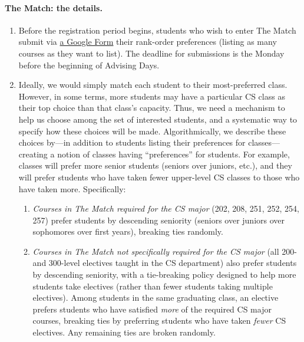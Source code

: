 \documentclass{article}
\begin{document}
\paragraph{The Match:  the details.}
\begin{enumerate}
\item Before the registration period begins, students who wish to enter The Match submit via \href{http://cs.carleton.edu/faculty/dln/match-form.html}{a Google Form} their rank-order preferences (listing as many courses as they want to list).  The deadline for submissions is the Monday before the beginning of Advising Days.

\item Ideally, we would simply match each student to their most-preferred class.  However, in some terms, more students may have a particular CS class as their top choice than that class's capacity.  Thus, we need a mechanism to help us choose among the set of interested students, and a systematic way to specify how these choices will be made.  Algorithmically, we describe these choices by---in addition to students listing their preferences for classes---creating a notion of classes having ``preferences'' for students.  For example, classes will prefer more senior students (seniors over juniors, etc.), and they will prefer students who have taken fewer upper-level CS classes to those who have taken more.  Specifically:
  \begin{enumerate}
  \item \emph{Courses in The Match required for the CS major} (202, 208, 251, 252, 254, 257) prefer students by descending seniority (seniors over juniors over sophomores over first years), breaking ties randomly.
  \item \emph{Courses in The Match not specifically required for the CS major} (all 200- and 300-level electives taught in the CS department) also prefer students by descending seniority, with a tie-breaking policy designed to help more students take electives (rather than fewer students taking multiple electives).  Among students in the same graduating class, an elective prefers students who have satisfied \emph{more} of the required CS major courses, breaking ties by preferring students who have taken \emph{fewer} CS electives.  Any remaining ties are broken randomly.
  \end{enumerate}

\end{enumerate}
\end{document}
